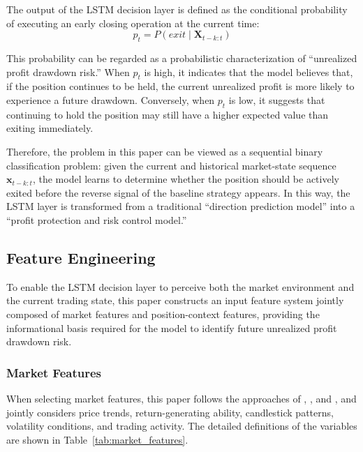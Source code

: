 \documentclass[12pt]{article}
\begin{document}
The output of the LSTM decision layer is defined as the conditional probability of executing 
an early closing operation at the current time:
\begin{equation}
    p_t = P(exit \mid \mathbf{X}_{t-k:t})
\end{equation}

This probability can be regarded as a probabilistic characterization of ``unrealized profit 
drawdown risk.'' When $p_t$ is high, it indicates that the model believes that, if the position 
continues to be held, the current unrealized profit is more likely to experience a future 
drawdown. Conversely, when $p_t$ is low, it suggests that continuing to hold the position may 
still have a higher expected value than exiting immediately.

Therefore, the problem in this paper can be viewed as a sequential binary classification 
problem: given the current and historical market-state sequence $\mathbf{x}_{t-k:t}$, the model 
learns to determine whether the position should be actively exited before the reverse signal of 
the baseline strategy appears. In this way, the LSTM layer is transformed from a traditional 
``direction prediction model'' into a ``profit protection and risk control model.''

\subsection{Feature Engineering}

To enable the LSTM decision layer to perceive both the market environment and the current 
trading state, this paper constructs an input feature system jointly composed of market 
features and position-context features, providing the informational basis required for the 
model to identify future unrealized profit drawdown risk.

\subsubsection{Market Features}

When selecting market features, this paper follows the approaches of \citet{FischerKrauss2018}, 
\citet{HuangWanZhangLu2024}, and \citet{AlKhatibEtAl2022}, and jointly considers price trends, 
return-generating ability, candlestick patterns, volatility conditions, and trading activity. 
The detailed definitions of the variables are shown in Table~\ref{tab:market_features}.
\end{document}
